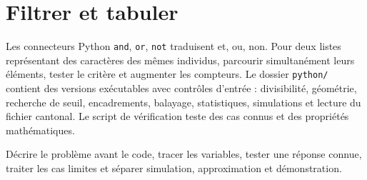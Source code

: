 \documentclass[../cours_2de.tex]{subfiles}
\begin{document}
\section{Filtrer et tabuler}
Les connecteurs Python \texttt{and}, \texttt{or}, \texttt{not} traduisent et, ou, non. Pour deux listes représentant des caractères des mêmes individus, parcourir simultanément leurs éléments, tester le critère et augmenter les compteurs.
Le dossier \texttt{python/} contient des versions exécutables avec contrôles d'entrée : divisibilité, géométrie, recherche de seuil, encadrements, balayage, statistiques, simulations et lecture du fichier cantonal. Le script de vérification teste des cas connus et des propriétés mathématiques.
\begin{retenir}
Décrire le problème avant le code, tracer les variables, tester une réponse connue, traiter les cas limites et séparer simulation, approximation et démonstration.
\end{retenir}
\end{document}

